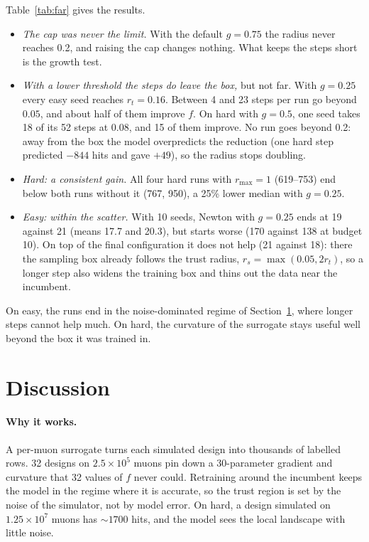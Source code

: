 \documentclass[11pt,a4paper]{article}
\begin{document}
Table~\ref{tab:far} gives the results.
\begin{itemize}
  \item \emph{The cap was never the limit.} With the default $g=0.75$ the radius never reaches 0.2,
        and raising the cap changes nothing. What keeps the steps short is the growth test.
  \item \emph{With a lower threshold the steps do leave the box,} but not far. With $g=0.25$
        every easy seed reaches $r_t=0.16$. Between 4 and 23 steps per run go beyond $0.05$, and
        about half of them improve $f$. On hard with $g=0.5$, one seed takes 18 of its 52 steps at
        $0.08$, and 15 of them improve. No run goes beyond 0.2: away from the box the model
        overpredicts the reduction (one hard step predicted $-844$ hits and gave $+49$), so the
        radius stops doubling.
  \item \emph{Hard: a consistent gain.} All four hard runs with $r_\text{max}=1$ (619--753) end below
        both runs without it (767, 950), a 25\% lower median with $g=0.25$.
  \item \emph{Easy: within the scatter.} With 10 seeds, Newton with $g=0.25$ ends at 19 against 21
        (means 17.7 and 20.3), but starts worse (170 against 138 at budget 10). On top of the final
        configuration it does not help (21 against 18): there the sampling box already follows the
        trust radius, $r_s=\max(0.05,2r_t)$, so a longer step also widens the training box and
        thins out the data near the incumbent.
\end{itemize}
On easy, the runs end in the noise-dominated regime of Section~\ref{sec:disc}, where longer steps
cannot help much. On hard, the curvature of the surrogate stays useful well beyond the box it was
trained in.

\section{Discussion}\label{sec:disc}

\paragraph{Why it works.} A per-muon surrogate turns each simulated design into thousands of
labelled rows. 32 designs on $2.5\times10^5$ muons pin down a 30-parameter gradient and
curvature that 32 values of $f$ never could. Retraining around the incumbent keeps the model in
the regime where it is accurate, so the trust region is set by the noise of the simulator, not by
model error. On hard, a design simulated on $1.25\times10^7$ muons has $\sim1700$ hits, and the
model sees the local landscape with little noise.
\end{document}
